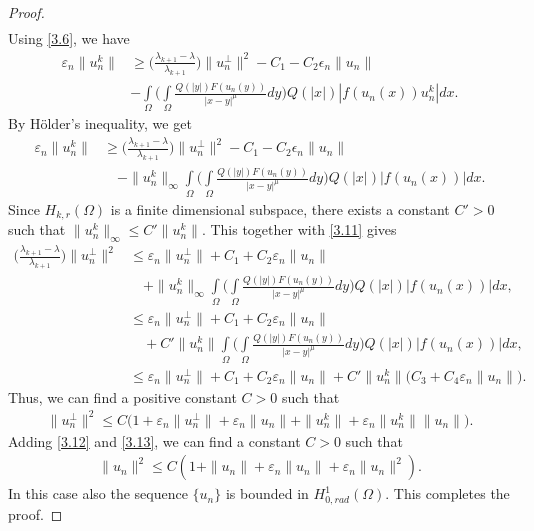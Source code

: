 \documentclass[11pt]{amsart}
\numberwithin{equation}{section}
\newcommand{\hr}{H^1_{0, rad}(\Omega)}
\newcommand{\1}{\frac{1}{2}}
\begin{document}
\begin{proof}
\begin{align}
		\end{align}
		Using \eqref{3.6}, we have
		\begin{align}
			\varepsilon_n\|u_n^k\| & \geq \Bigg(\frac{\lambda_{k+1} -\lambda}{\lambda_{k+1}}\Bigg) \|u_n^\perp\|^2 - C_1 - C_2 \epsilon_n \|u_n\|\nonumber\\
			&- \int\limits_\Omega \Bigg( \int\limits_\Omega \frac{Q(|y|)F(u_n(y))}{|x-y|^\mu} dy\Bigg)Q(|x|) \left|f(u_n(x))u_n^k\right| dx. \nonumber
		\end{align}
		By H\"older's inequality, we get
		\begin{align}
			\varepsilon_n\|u_n^k\|	& \geq \Bigg(\frac{\lambda_{k+1} -\lambda}{\lambda_{k+1}}\Bigg) \|u_n^\perp\|^2 - C_1 - C_2 \epsilon_n \|u_n\| \nonumber\\
			& \quad- \|u_n^k\|_\infty\int\limits_\Omega \Bigg( \int\limits_\Omega \frac{Q(|y|)F(u_n(y))}{|x-y|^\mu} dy\Bigg) Q(|x|)|f(u_n(x))| dx. \nonumber
		\end{align}
		Since $H_{k,r}(\Omega)$ is a finite dimensional subspace, there exists a constant $C'>0$ such that $\|u_n^k\|_\infty \leq C'\|u_n^k\|$. This together with \eqref{3.11} gives
		\begin{align}
			\Bigg(\frac{\lambda_{k+1} -\lambda}{\lambda_{k+1}}\Bigg) \|u_n^\perp\|^2 &\leq \varepsilon_n\|u_n^\perp\|+ C_1 + C_2 \varepsilon_n \|u_n\| \nonumber\\
			& \quad+ \|u_n^k\|_\infty\int\limits_\Omega \Bigg( \int\limits_\Omega \frac{Q(|y|)F(u_n(y))}{|x-y|^\mu} dy\Bigg) Q(|x|)|f(u_n(x))| dx, \nonumber\\
			& \leq \varepsilon_n\|u_n^\perp\|+ C_1 + C_2 \varepsilon_n \|u_n\| \nonumber\\
			&\quad+ C'\|u_n^k\|\int\limits_\Omega \Bigg( \int\limits_\Omega \frac{Q(|y|)F(u_n(y))}{|x-y|^\mu} dy\Bigg) Q(|x|)|f(u_n(x))| dx, \nonumber\\
			& \leq \varepsilon_n\|u_n^\perp\|+ C_1 + C_2 \varepsilon_n \|u_n\| + C'\|u_n^k\| \big(C_3+ C_4 \varepsilon_n \|u_n\| \big). \nonumber 
		\end{align}
		Thus, we can find a positive constant $C>0$ such that 
		\begin{align}
			\|u_n^\perp\|^2 \leq C\big( 1+\varepsilon_n\|u_n^\perp\| + \varepsilon_n \|u_n\| + \|u_n^k\|+\varepsilon_n \|u_n^k\| \|u_n\|\big). \label{3.13}
		\end{align}
		Adding \eqref{3.12} and \eqref{3.13}, we can find a constant $C>0$ such that
		\begin{align}
			\|u_n\|^2  \leq C( 1+ \|u_n\| + \varepsilon_n \|u_n\|+ \varepsilon_n \|u_n\|^2). \nonumber
		\end{align}
		In this case also the sequence $\{u_n\}$ is bounded in $\hr$. This completes the proof.
	\end{proof}
\end{document}
